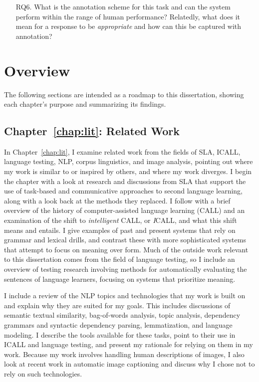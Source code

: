 \begin{itemize}
\item[RQ6.]{What is the annotation scheme for this task and can the system perform within the range of human performance? Relatedly, what does it mean for a response to be \textit{appropriate} and how can this be captured with annotation?}
\end{itemize}


\section{Overview}
\label{sec:overview}

The following sections are intended as a roadmap to this dissertation, showing each chapter's purpose and summarizing its findings.

\subsection{Chapter~\ref{chap:lit}: Related Work}

In Chapter~\ref{chap:lit}, I examine related work from the fields of SLA, ICALL, language testing, NLP, corpus linguistics, and image analysis, pointing out where my work is similar to or inspired by others, and where my work diverges. I begin the chapter with a look at research and discussions from SLA that support the use of task-based and communicative approaches to second language learning, along with a look back at the methods they replaced. I follow with a brief overview of the history of computer-assisted language learning (CALL) and an examination of the shift to \textit{intelligent} CALL, or \textit{I}CALL, and what this shift means and entails. I give examples of past and present systems that rely on grammar and lexical drills, and contrast these with more sophisticated systems that attempt to focus on meaning over form. Much of the outside work relevant to this dissertation comes from the field of language testing, so I include an overview of testing research involving methods for automatically evaluating the sentences of language learners, focusing on systems that prioritize meaning.

I include a review of the NLP topics and technologies that my work is built on and explain why they are suited for my goals. This includes discussions of semantic textual similarity, bag-of-words analysis, topic analysis, dependency grammars and syntactic dependency parsing, lemmatization, and language modeling. I describe the tools available for these tasks, point to their use in ICALL and language testing, and present my rationale for relying on them in my work. Because my work involves handling human descriptions of images, I also look at recent work in automatic image captioning and discuss why I chose not to rely on such technologies.

